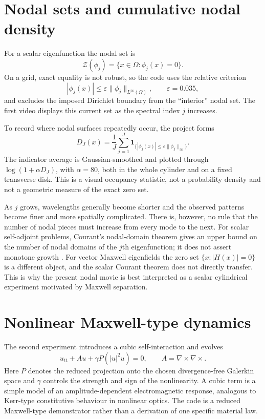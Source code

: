 \documentclass[10pt]{article}
\begin{document}
\section{Nodal sets and cumulative nodal density}
For a scalar eigenfunction the nodal set is
\[
\mathcal Z(\phi_j)=\{x\in\Omega:\phi_j(x)=0\}.
\]
On a grid, exact equality is not robust, so the code uses the relative criterion
\begin{equation}
|\phi_j(x)|\le \varepsilon\|\phi_j\|_{L^\infty(\Omega)},
\qquad \varepsilon=0.035,
\end{equation}
and excludes the imposed Dirichlet boundary from the ``interior'' nodal set.  The first video displays this current set as the spectral index $j$ increases.

To record where nodal surfaces repeatedly occur, the project forms
\begin{equation}
D_J(x)=\frac1J\sum_{j=1}^{J}
\mathbf 1_{\{|\phi_j(x)|\le\varepsilon\|\phi_j\|_\infty\}}.
\end{equation}
The indicator average is Gaussian-smoothed and plotted through
$\log(1+\alpha D_J)$, with $\alpha=80$, both in the whole cylinder and on a fixed transverse disk.  This is a visual occupancy statistic, not a probability density and not a geometric measure of the exact zero set.

As $j$ grows, wavelengths generally become shorter and the observed patterns become finer and more spatially complicated.  There is, however, no rule that the number of nodal pieces must increase from every mode to the next.  For scalar self-adjoint problems, Courant's nodal-domain theorem gives an upper bound on the number of nodal domains of the $j$th eigenfunction; it does not assert monotone growth \cite{courant}.  For vector Maxwell eigenfields the zero set $\{x:|H(x)|=0\}$ is a different object, and the scalar Courant theorem does not directly transfer.  This is why the present nodal movie is best interpreted as a scalar cylindrical experiment motivated by Maxwell separation.

\section{Nonlinear Maxwell-type dynamics}
The second experiment introduces a cubic self-interaction and evolves
\begin{equation}
 u_{tt}+Au+\gamma P(|u|^2u)=0,
 \qquad A=\nabla\times\nabla\times.
\end{equation}
Here $P$ denotes the reduced projection onto the chosen divergence-free Galerkin space and $\gamma$ controls the strength and sign of the nonlinearity.  A cubic term is a simple model of an amplitude-dependent electromagnetic response, analogous to Kerr-type constitutive behaviour in nonlinear optics.  The code is a reduced Maxwell-type demonstrator rather than a derivation of one specific material law.
\end{document}
